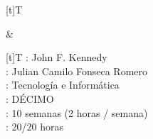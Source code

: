 \documentclass[letterpaper,10pt,spanish]{sphinxmanual}
\begin{document}
\begin{savenotes}\sphinxattablestart
\sphinxthistablewithglobalstyle
\centering
\begin{tabular}[t]{}
\sphinxtoprule
\sphinxtableatstartofbodyhook

\begin{savenotes}\sphinxattablestart
\sphinxthistablewithglobalstyle
\centering
\begin{tabulary}{\linewidth}[t]{T}
\sphinxtoprule
\sphinxtableatstartofbodyhook
\sphinxAtStartPar
{}
\\
\sphinxbottomrule
\end{tabulary}
\sphinxtableafterendhook\par
\sphinxattableend\end{savenotes}
&

\begin{savenotes}\sphinxattablestart
\sphinxthistablewithglobalstyle
\centering
\begin{tabulary}{\linewidth}[t]{T}
\sphinxtoprule
\sphinxtableatstartofbodyhook
\sphinxAtStartPar
{}: John F. Kennedy
\\
\sphinxhline
\sphinxAtStartPar
{}: Julian Camilo Fonseca Romero
\\
\sphinxhline
\sphinxAtStartPar
{}: Tecnología e Informática
\\
\sphinxhline
\sphinxAtStartPar
{}: DÉCIMO
\\
\sphinxhline
\sphinxAtStartPar
{}: 10 semanas (2 horas / semana)
\\
\sphinxhline
\sphinxAtStartPar
{}: 20/20 horas
\\
\sphinxbottomrule
\end{tabulary}
\sphinxtableafterendhook\par
\sphinxattableend\end{savenotes}
\\
\sphinxbottomrule
\end{tabular}
\sphinxtableafterendhook\par
\sphinxattableend\end{savenotes}
\end{document}
